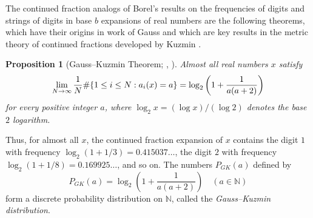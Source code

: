 \documentclass[10pt]{article}
\newtheorem{proposition}[lemma]{Proposition}
\theoremstyle{definition}
\newtheorem*{thmGK}{Gauss--Kuzmin Theorem}
\numberwithin{equation}{section}
\numberwithin{lemma}{section}
\newcommand{\NN}{\mathbb{N}}
\begin{document}
The continued fraction analogs of Borel's results on the frequencies of
digits and strings of digits in base $b$ expansions of real
numbers are the following theorems, which have their origins in work of
Gauss and which are key results in the metric theory of continued
fractions developed by Kuzmin \cite{kuzmin1929}.  

\begin{proposition}
[Gauss--Kuzmin Theorem; {\cite[(3.25)]{neverending-fractions-book}},
{\cite[Proposition 4.1.1]{iosifescu-kraaikamp-book}}]
Almost all real numbers $x$ satisfy
\begin{equation}
\notag
\lim_{N\to\infty}\frac1N\#\{1\le i\le N: 
a_{i}(x)=a\} = \log_2\left(1+\frac1{a(a+2)}\right)
\end{equation}
for every positive integer $a$, where 
$\log_2 x=(\log x)/(\log 2)$ denotes the base $2$ logarithm.
\end{proposition}

Thus, for almost all $x$, the continued fraction expansion of $x$ contains the
digit $1$ with frequency $\log_2(1+1/3)= 0.415037\dots$, 
the digit $2$ with frequency $\log_2(1+1/8)=0.169925\dots$, 
and so on.  The numbers $P_{GK}(a)$ defined by 
\begin{equation}
\label{eq:gk-distribution-def}
P_{GK}(a)=\log_2\left(1+\frac1{a(a+2)}\right)
\quad (a\in\NN)
\end{equation}
form a discrete probability distribution on $\NN$, called the 
\emph{Gauss--Kuzmin distribution}.

\end{document}
